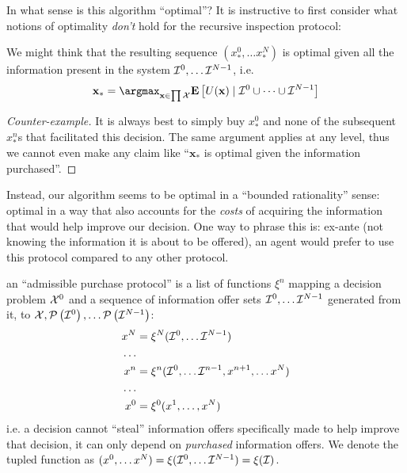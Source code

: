 In what sense is this algorithm ``optimal''? It is instructive to first consider what notions of optimality \emph{don't} hold for the recursive inspection protocol:

\begin{nontheorem}
We might think that the resulting sequence $(x^0_*,\dots x^N_*)$ is optimal given all the information present in the system $\mathcal{I}^0,\dots\mathcal{I}^{N-1}$, i.e.
\begin{equation*}
  \mathbf{x}_* = \argmax_{\mathbf{x}\in\prod\Actions}\Expectof{
    U(\mathbf{x})\mid \infooffers^0\cup\dots\cup\infooffers^{N-1}
  }
\end{equation*}
\end{nontheorem}
\begin{proof}[Counter-example]
It is always best to simply buy $x^0_*$ and none of the subsequent $x^n_*$s that facilitated this decision. The same argument applies at any level, thus we cannot even make any claim like ``$\mathbf{x}_*$ is optimal given the information purchased''.
\end{proof}

Instead, our algorithm seems to be optimal in a ``bounded rationality'' sense: optimal in a way that also accounts for the \emph{costs} of acquiring the information that would help improve our decision. One way to phrase this is: ex-ante (not knowing the information it is about to be offered), an agent would prefer to use this protocol compared to any other protocol.

\begin{definition}
  an ``admissible purchase protocol'' is a list of functions $\xi^n$ mapping a decision problem $\mathcal{X}^0$ and a sequence of information offer sets $\mathcal{I}^0,\dots\mathcal{I}^{N-1}$ generated from it, to $\mathcal{X},\mathcal{P}\left(\mathcal{I}^0\right),\dots\mathcal{P}\left(\mathcal{I}^{N-1}\right)$:
  \begin{align*}
    x^N &= \xi^N(\mathcal{I}^0,\dots\mathcal{I}^{N-1}) \\
    \dots&\\
    x^n &= \xi^n(\mathcal{I}^0,\dots\mathcal{I}^{n-1}, x^{n+1},\dots x^N) \\
    \dots&\\
    x^0 &= \xi^0(x^1,\dots, x^N) \\
  \end{align*}
  i.e. a decision cannot ``steal'' information offers specifically made to help improve that decision, it can only depend on \emph{purchased} information offers. We denote the tupled function as $(x^0,\dots x^N)=\xi(\mathcal{I}^0,\dots\mathcal{I}^{N-1})=\xi(\mathcal{I})$.
  \label{def:app}
\end{definition}

